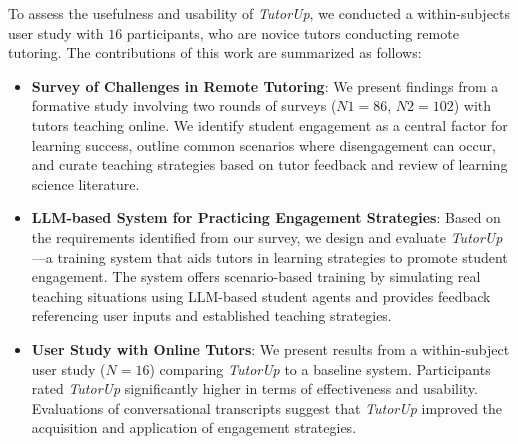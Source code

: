 To assess the usefulness and usability of \textit{TutorUp}, we conducted a within-subjects user study with $16$ participants, who are novice tutors conducting remote tutoring.  
The contributions of this work are summarized as follows:
\begin{itemize}
\item \textbf{Survey of Challenges in Remote Tutoring}: We present findings from a formative study involving two rounds of surveys ($N1 = 86$, $N2 = 102$) with tutors teaching online. We identify student engagement as a central factor for learning success, outline common scenarios where disengagement can occur, and curate teaching strategies based on tutor feedback and review of learning science literature.
%
\item \textbf{LLM-based System for Practicing Engagement Strategies}: Based on the requirements identified from our survey, we design and evaluate \textit{TutorUp}—a training system that aids tutors in learning strategies to promote student engagement. The system offers scenario-based training by simulating real teaching situations using LLM-based student agents and provides feedback referencing user inputs and established teaching strategies.
%
\item \textbf{User Study with Online Tutors}: We present results from a within-subject user study ($N = 16$) comparing \textit{TutorUp} to a baseline system. Participants rated \textit{TutorUp} significantly higher in terms of effectiveness and usability. Evaluations of conversational transcripts suggest that \textit{TutorUp} improved the acquisition and application of engagement strategies.
\end{itemize}


